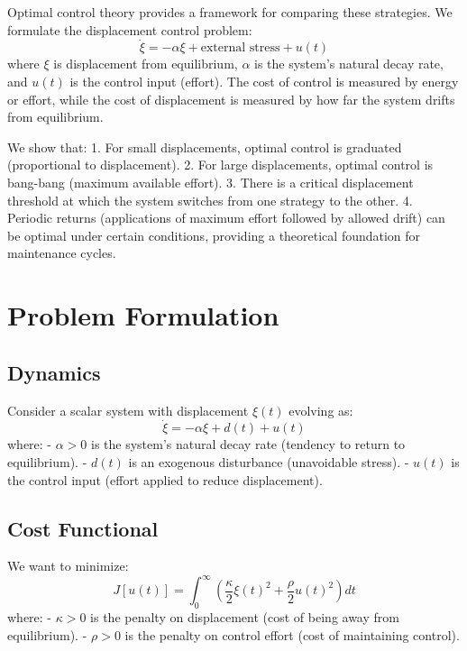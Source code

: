 \documentclass[12pt]{article}
\begin{document}
Optimal control theory provides a framework for comparing these strategies. We formulate the displacement control problem:
\begin{equation}
\dot{\xi} = -\alpha \xi + \text{external stress} + u(t)
\end{equation}
where $\xi$ is displacement from equilibrium, $\alpha$ is the system's natural decay rate, and $u(t)$ is the control input (effort). The cost of control is measured by energy or effort, while the cost of displacement is measured by how far the system drifts from equilibrium.

We show that:
1. For small displacements, optimal control is graduated (proportional to displacement).
2. For large displacements, optimal control is bang-bang (maximum available effort).
3. There is a critical displacement threshold at which the system switches from one strategy to the other.
4. Periodic returns (applications of maximum effort followed by allowed drift) can be optimal under certain conditions, providing a theoretical foundation for maintenance cycles.

\section{Problem Formulation}

\subsection{Dynamics}

Consider a scalar system with displacement $\xi(t)$ evolving as:
\begin{equation}
\dot{\xi} = -\alpha \xi + d(t) + u(t)
\end{equation}
where:
- $\alpha > 0$ is the system's natural decay rate (tendency to return to equilibrium).
- $d(t)$ is an exogenous disturbance (unavoidable stress).
- $u(t)$ is the control input (effort applied to reduce displacement).

\subsection{Cost Functional}

We want to minimize:
\begin{equation}
J[u(t)] = \int_0^\infty \left( \frac{\kappa}{2} \xi(t)^2 + \frac{\rho}{2} u(t)^2 \right) dt
\end{equation}
where:
- $\kappa > 0$ is the penalty on displacement (cost of being away from equilibrium).
- $\rho > 0$ is the penalty on control effort (cost of maintaining control).
\end{document}
